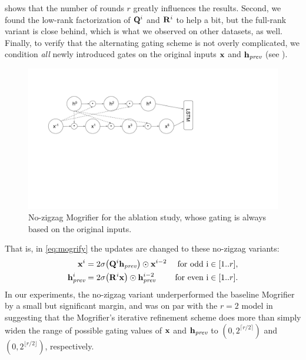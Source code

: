  shows that the number of rounds $r$
greatly influences the results.
%
Second, we found the low-rank factorization of $\mathbf{Q}^i$ and $\mathbf{R}^i$ to
help a bit, but the full-rank variant is close behind, which is what we
observed on other datasets, as well.
%
Finally, to verify that the alternating gating scheme is not overly
complicated, we condition \emph{all} newly introduced gates on the
original inputs $\mathbf{x}$ and $\mathbf{h}_{\textit{prev}}$ (see ).
%
\begin{figure}[!t]\centering
  \includegraphics[scale=0.7,trim={1.8cm 7.5cm 8.3cm 2.5cm},clip]
                  {mogrifier/figure/mogrifier-no-zigzag.pdf}
  \caption[No-zigzag Mogrifier for the ablation study.]{No-zigzag Mogrifier for the ablation study, whose gating is always based on the original inputs.}
  \label{fig:mogrifier-no-zigzag}
\end{figure}
%
That is, in \eqref{eq:mogrify} the updates are changed to these no-zigzag variants:
\begin{align*}
  \mathbf{x}^i &= 2\sigma\bigl(\mathbf{Q}^{i}\mathbf{h}_{\textit{prev}}\bigr) \odot \mathbf{x}^{i-2} &
  \text{for odd i} \in [1..r],\\
  \mathbf{h}_{\textit{prev}}^i &= 2\sigma\bigl(\mathbf{R}^{i}\mathbf{x}\bigr) \odot \mathbf{h}_{\textit{prev}}^{i-2}
  & \text{for even i} \in [1..r].
\end{align*}
In our experiments, the no-zigzag variant underperformed the baseline
Mogrifier by a small but significant margin, and was on par with the
$r=2$ model in  suggesting that the
Mogrifier's iterative refinement scheme does more than simply widen
the range of possible gating values of $\mathbf{x}$ and $\mathbf{h}_{\textit{prev}}$ to $(0,
2^{\lceil r/2 \rceil})$ and $(0, 2^{\lfloor r/2 \rfloor})$,
respectively.

